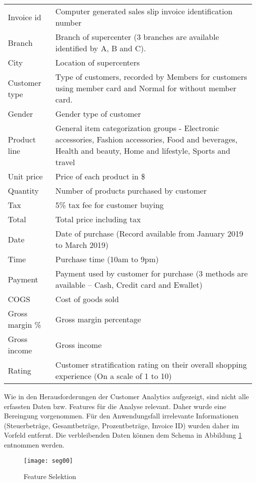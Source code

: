 \begin{center}
  \begin{tabular}{l | m{10cm}}
    Invoice id & Computer generated sales slip invoice identification number\\
    Branch & Branch of supercenter (3 branches are available identified by A, B and C).\\
    City & Location of supercenters\\
    Customer type & Type of customers, recorded by Members for customers using member card and Normal for without member card.\\
    Gender & Gender type of customer\\
    Product line & General item categorization groups - Electronic accessories, Fashion accessories, Food and beverages, Health and beauty, Home and lifestyle, Sports and travel\\
    Unit price & Price of each product in \$\\
    Quantity & Number of products purchased by customer\\
    Tax & 5\% tax fee for customer buying\\
    Total & Total price including tax\\
    Date & Date of purchase (Record available from January 2019 to March 2019)\\
    Time & Purchase time (10am to 9pm)\\
    Payment & Payment used by customer for purchase (3 methods are available – Cash, Credit card and Ewallet)\\
    COGS & Cost of goods sold\\
    Gross margin \% & Gross margin percentage\\
    Gross income & Gross income\\
    Rating & Customer stratification rating on their overall shopping experience (On a scale of 1 to 10)
  \end{tabular}
\end{center}

Wie in den Herausforderungen der Customer Analytics aufgezeigt, sind nicht alle erfassten Daten bzw. Features für die Analyse relevant. Daher wurde eine Bereingung vorgenommen.
Für den Anwendungsfall irrelevante Informationen (Steuerbeträge, Gesamtbeträge, Prozentbeträge, Invoice ID) wurden daher im Vorfeld entfernt. Die verbleibenden Daten können dem Schema in Abbildung \ref{fig:fs00} entnommen werden.

\begin{figure}[ht]
  \centering
  \texttt{[image: seg00]}
  \caption{Feature Selektion}
  \label{fig:fs00}
\end{figure}

